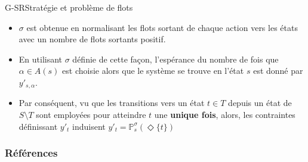 \documentclass[compress]{beamer}
\theoremstyle{theorem}%
\begin{document}
\begin{frame}{G-SR}{Stratégie et problème de flots}
  \begin{itemize}
    \item $\sigma$ est obtenue en normalisant les flots sortant de chaque action vers les états avec un nombre de flots sortants positif.
    \item En utilisant $\sigma$ définie de cette façon, l'espérance du nombre de fois que $\alpha \in A(s)$ est choisie alors que le système se trouve en l'état $s$ est donné par $y'_{s, \alpha}$.
    \item Par conséquent, vu que les transitions vers un état $t \in T$ depuis un état de $S \setminus T$ sont employées pour atteindre $t$ une \textbf{unique fois}, alors, les contraintes définissant $y'_t$ induisent $y'_t = \mathbb{P}_s^\sigma(\Diamond \{t\})$
  \end{itemize}
\end{frame}


\begin{frame}[allowframebreaks]
        \nocite{*}
        \frametitle{Références}
      \printbibliography
\end{frame}
\end{document}
